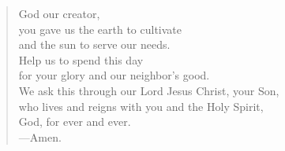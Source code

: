 \prayer

\setlength{\vleftmargin}{\prayerleftmargini}

\begin{verse}
God our creator,\\
you gave us the earth to cultivate\\
and the sun to serve our needs.\\
Help us to spend this day\\
for your glory and our neighbor’s good.\\
We ask this through our Lord Jesus Christ, your Son,\\
who lives and reigns with you and the Holy Spirit,\\
God, for ever and ever.\\
{\color{red}---\thinspace}Amen.
\end{verse}

\setlength{\vleftmargin}{\defleftmargini}